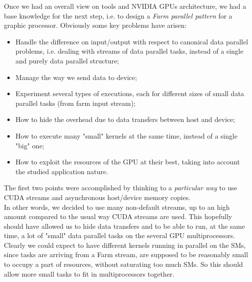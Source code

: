 Once we had an overall view on tools and NVIDIA GPUs architecture, we had a base knowledge for the next step, i.e. to design a \textit{Farm parallel pattern} for a graphic processor. Obviously some key problems have arisen:
\begin{itemize}
	\item Handle the difference on input/output with respect to canonical data parallel problems, i.e. dealing with streams of data parallel tasks, instead of a single and purely data parallel structure;
	\item Manage the way we send data to device;
	\item Experiment several types of executions, each for different sizes of small data parallel tasks (from farm input stream);
	\item How to hide the overhead due to data transfers between host and device;
	\item How to execute many "small" kernels at the same time, instead of a single "big" one;
	\item How to exploit the resources of the GPU at their best, taking into account the studied application nature.
\end{itemize}
The first two points were accomplished by thinking to a \textit{particular way} to use CUDA streams and asynchronous host/device memory copies.\\
In other words, we decided to use many non-default streams, up to an high amount compared to the usual way CUDA streams are used.
This hopefully should have allowed us to hide data transfers and to be able to run, at the same time, a lot of "small" data parallel tasks on the several GPU multiprocessors.\\
Clearly we could expect to have different kernels running in parallel on the SMs, since tasks are arriving from a Farm stream, are supposed to be reasonably small to occupy a part of resources, without saturating too much SMs.
So this should allow more small tasks to fit in multiprocessors together.\\ 

